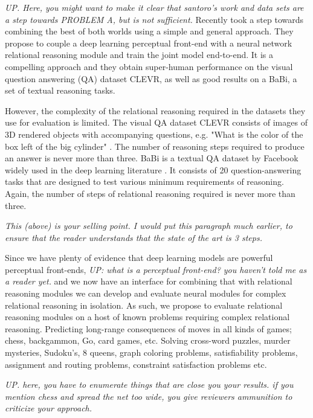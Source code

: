\emph{UP. Here, you might want to make it clear that santoro's work and data sets are a step towards PROBLEM A, but is not sufficient.}
Recently \citet{santoro2017simple} took a step towards combining the best of both worlds using a simple and general approach. They propose to couple a deep learning perceptual front-end with a neural network relational reasoning module and train the joint model end-to-end. It is a compelling approach and they obtain super-human performance on the visual
question answering (QA)
dataset CLEVR, as well as good results on a BaBi, a set of textual reasoning tasks.

However, the complexity of the relational reasoning required in the datasets they use for evaluation is limited. The visual QA dataset CLEVR consists of images of 3D rendered objects with accompanying questions, e.g. "What is the color of the box left of the big cylinder" \cite{johnson2016clevr}. The number of reasoning steps required to produce an answer is never more than three. BaBi is a textual QA dataset by Facebook widely used in the deep learning literature \cite{weston2015towards}. It consists of 20 question-answering tasks that are designed to test various minimum requirements of reasoning. Again, the number of steps of relational reasoning required is never more than three.

\emph{This (above) is your selling point. I would put this paragraph much earlier, to ensure that the reader understands that the state of the art is 3 steps.}

Since we have plenty of evidence that deep learning models are powerful perceptual front-ends,
\emph{UP: what is a perceptual front-end? you haven't told me as a reader yet.}
and we now have an interface for combining that with relational reasoning modules we can develop and evaluate neural modules for complex relational reasoning in isolation.
As such, we propose to evaluate relational reasoning modules on a host of known problems requiring complex relational reasoning. Predicting long-range consequences of moves in all kinds of games; chess, backgammon, Go, card games, etc. Solving cross-word puzzles, murder mysteries, Sudoku's, 8 queens, graph coloring problems, satisfiability problems, assignment and routing problems, constraint satisfaction problems etc.

\emph{UP. here, you have to enumerate things that are close you your results. if you mention chess and spread the net too wide, you give reviewers ammunition to criticize your approach.}

